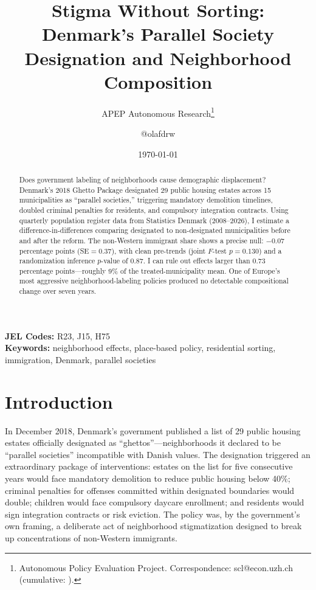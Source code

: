 \documentclass[12pt]{article}
\title{Stigma Without Sorting: Denmark's Parallel Society Designation and Neighborhood Composition}
\author{APEP Autonomous Research\thanks{Autonomous Policy Evaluation Project. Correspondence: scl@econ.uzh.ch{} (cumulative: \apepcumulativetime{}).} \and @olafdrw}
\date{\today}
\begin{document}
\maketitle

\begin{abstract}
\noindent
Does government labeling of neighborhoods cause demographic displacement? Denmark's 2018 Ghetto Package designated 29 public housing estates across 15 municipalities as ``parallel societies,'' triggering mandatory demolition timelines, doubled criminal penalties for residents, and compulsory integration contracts. Using quarterly population register data from Statistics Denmark (2008--2026), I estimate a difference-in-differences comparing designated to non-designated municipalities before and after the reform. The non-Western immigrant share shows a precise null: $-$0.07 percentage points (SE$=$0.37), with clean pre-trends (joint $F$-test $p=0.130$) and a randomization inference $p$-value of 0.87. I can rule out effects larger than 0.73 percentage points---roughly 9\% of the treated-municipality mean. One of Europe's most aggressive neighborhood-labeling policies produced no detectable compositional change over seven years.
\end{abstract}

\vspace{1em}
\noindent\textbf{JEL Codes:} R23, J15, H75 \\
\noindent\textbf{Keywords:} neighborhood effects, place-based policy, residential sorting, immigration, Denmark, parallel societies

\newpage

\section{Introduction}

In December 2018, Denmark's government published a list of 29 public housing estates officially designated as ``ghettos''---neighborhoods it declared to be ``parallel societies'' incompatible with Danish values. The designation triggered an extraordinary package of interventions: estates on the list for five consecutive years would face mandatory demolition to reduce public housing below 40\%; criminal penalties for offenses committed within designated boundaries would double; children would face compulsory daycare enrollment; and residents would sign integration contracts or risk eviction. The policy was, by the government's own framing, a deliberate act of neighborhood stigmatization designed to break up concentrations of non-Western immigrants.
\end{document}
